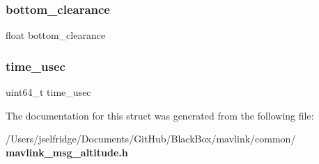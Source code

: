 \subsubsection{bottom\+\_\+clearance}
{\footnotesize\ttfamily float bottom\+\_\+clearance}

\mbox{\label{struct____mavlink__altitude__t_a2db60704c293664dcb6159b55c98c2f2}} 
\subsubsection{time\+\_\+usec}
{\footnotesize\ttfamily uint64\+\_\+t time\+\_\+usec}



The documentation for this struct was generated from the following file\+:\begin{DoxyCompactItemize}
\item 
/\+Users/jselfridge/\+Documents/\+Git\+Hub/\+Black\+Box/mavlink/common/\textbf{ mavlink\+\_\+msg\+\_\+altitude.\+h}\end{DoxyCompactItemize}
